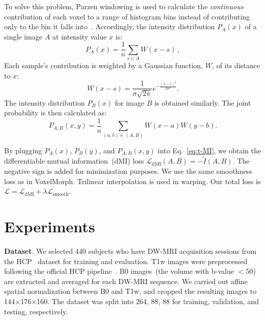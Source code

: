 \documentclass[]{spie}  %
\begin{document}
To solve this problem, Parzen windowing is used to calculate the \textit{continuous} contribution of each voxel to a range of histogram bins instead of contributing only to the bin it falls into~\cite{thevenaz2000optimization, guo2019multi}. Accordingly, the intensity distribution $P_A(x)$  of a single image $A$ at intensity value $x$ is:
	\begin{equation}
			P_A(x)=\frac{1}{n} \sum_{s \in A} W(x-s)\,,
		\end{equation}
Each sample's contribution is weighted by a Gaussian function, $W$, of its distance to $x$:
	\begin{equation}
		W(x-s)=\frac{1}{\sigma \sqrt{2 \pi}} e^{-\frac{(x-s)^{2}}{2 \sigma^{2}}}.
		\label{eq:Pwin}
	\end{equation}
%
 The intensity distribution $P_B(x)$ for image $B$ is obtained similarly. The joint probability is then calculated as:
%
\begin{equation}
	P_{A, B}(x, y)=\frac{1}{n} \sum_{(a, b) \in(A, B)} W(x-a) W(y-b).
\end{equation}

By plugging $P_A(x)$, $P_B(y)$, and $P_{A,B}(x,y)$ into Eq.~\eqref{eq:t-MI}, we obtain the differentiable mutual information~(dMI) loss $\mathcal{L}_{\operatorname{dMI}}(A, B) = -\tilde{I}(A, B)$. The negative sign is added for minimization purposes. We use the same smoothness loss as in VoxelMorph. Trilinear interpolation is used in warping. Our total loss is $\mathcal{L} = \mathcal{L}_{\operatorname{dMI}} + \lambda\mathcal{L}_{\operatorname{smooth}}$. 

\section{Experiments} 


\textbf{Dataset}. We selected 440 subjects who have DW-MRI acquisition sessions from the HCP~\cite{van2013wuShort} dataset for training and evaluation. T1w images were preprocessed following the official HCP pipeline~\cite{glasser2013minimalShort}. B0 images~(the volume with b-value $< 50$) are extracted and averaged for each DW-MRI sequence. We carried out affine spatial normalization between B0 and T1w, and cropped the resulting images to 144$\times$176$\times$160. The dataset was split into 264, 88, 88 for training, validation, and testing, respectively. 
\end{document}

